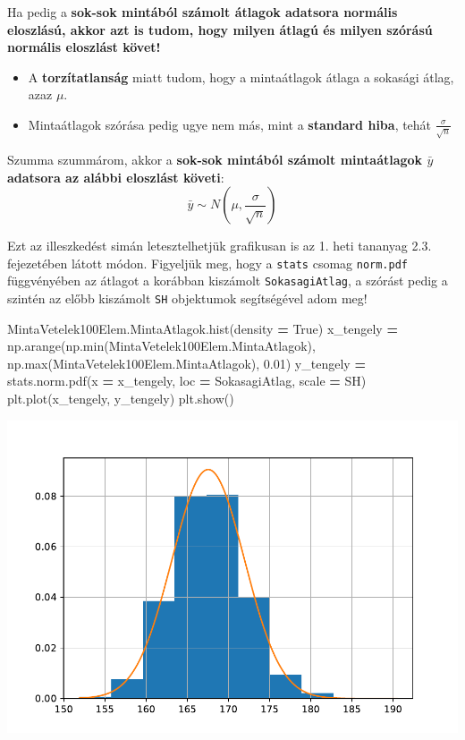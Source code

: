 \documentclass[
]{book}
\newenvironment{Shaded}{\begin{snugshade}}{\end{snugshade}}
\newcommand{\BuiltInTok}[1]{#1}
\newcommand{\FloatTok}[1]{\textcolor[rgb]{0.00,0.00,0.81}{#1}}
\newcommand{\NormalTok}[1]{#1}
\newcommand{\OperatorTok}[1]{\textcolor[rgb]{0.81,0.36,0.00}{\textbf{#1}}}
\newcommand{\VariableTok}[1]{\textcolor[rgb]{0.00,0.00,0.00}{#1}}
\providecommand{\tightlist}{%
  \setlength{\itemsep}{0pt}\setlength{\parskip}{0pt}}
\begin{document}
Ha pedig a \textbf{sok-sok mintából számolt átlagok adatsora normális eloszlású, akkor azt is tudom, hogy milyen átlagú és milyen szórású normális eloszlást követ!}

\begin{itemize}
\tightlist
\item
  A \textbf{torzítatlanság} miatt tudom, hogy a mintaátlagok átlaga a sokasági átlag, azaz \(\mu\).
\item
  Mintaátlagok szórása pedig ugye nem más, mint a \textbf{standard hiba}, tehát \(\frac{\sigma}{\sqrt{n}}\)
\end{itemize}

Szumma szummárom, akkor a \textbf{sok-sok mintából számolt mintaátlagok \(\bar{y}\) adatsora az alábbi eloszlást követi}: \[\bar{y} \sim N\left(\mu,\frac{\sigma}{\sqrt{n}}\right)\]

Ezt az illeszkedést simán letesztelhetjük grafikusan is az 1. heti tananyag 2.3. fejezetében látott módon.
Figyeljük meg, hogy a \texttt{stats} csomag \texttt{norm.pdf} függvényében az átlagot a korábban kiszámolt \texttt{SokasagiAtlag}, a szórást pedig a szintén az előbb kiszámolt \texttt{SH} objektumok segítségével adom meg!

\begin{Shaded}
\begin{Highlighting}[]
\NormalTok{MintaVetelek100Elem.MintaAtlagok.hist(density }\OperatorTok{=} \VariableTok{True}\NormalTok{)}
\NormalTok{x\_tengely }\OperatorTok{=}\NormalTok{ np.arange(np.}\BuiltInTok{min}\NormalTok{(MintaVetelek100Elem.MintaAtlagok), np.}\BuiltInTok{max}\NormalTok{(MintaVetelek100Elem.MintaAtlagok), }\FloatTok{0.01}\NormalTok{)}
\NormalTok{y\_tengely }\OperatorTok{=}\NormalTok{ stats.norm.pdf(x }\OperatorTok{=}\NormalTok{ x\_tengely, loc }\OperatorTok{=}\NormalTok{ SokasagiAtlag, scale }\OperatorTok{=}\NormalTok{ SH)}
\NormalTok{plt.plot(x\_tengely, y\_tengely)}
\NormalTok{plt.show()}
\end{Highlighting}
\end{Shaded}

\includegraphics{_main_files/figure-latex/unnamed-chunk-260-7.pdf}
\end{document}
